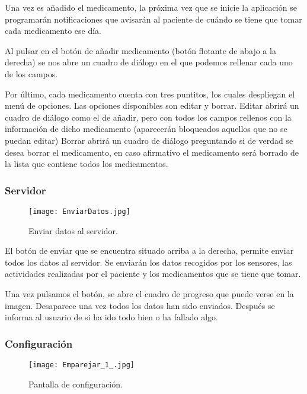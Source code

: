 \documentclass[11pt,spanish]{article}
\begin{document}
Una vez es añadido el medicamento, la próxima vez que se inicie la aplicación se programarán notificaciones que avisarán al paciente de cuándo se tiene que tomar cada medicamento ese día.
\newline

Al pulsar en el botón de añadir medicamento (botón flotante de abajo a la derecha) se nos abre un cuadro de diálogo en el que podemos rellenar cada uno de los campos.
\newline

Por último, cada medicamento cuenta con tres puntitos, los cuales despliegan el menú de opciones. Las opciones disponibles son editar y borrar. Editar abrirá un cuadro de diálogo como el de añadir, pero con todos los campos rellenos con la información de dicho medicamento (aparecerán bloqueados aquellos que no se puedan editar) Borrar abrirá un cuadro de diálogo preguntando si de verdad se desea borrar el medicamento, en caso afirmativo el medicamento será borrado de la lista que contiene todos los medicamentos.

\subsubsection{Servidor}
\begin{figure}[!htb]
\centering
\texttt{[image: EnviarDatos.jpg]}
\caption{Enviar datos al servidor.}
\end{figure}

El botón de enviar que se encuentra situado arriba a la derecha, permite enviar todos los datos al servidor. Se enviarán los datos recogidos por los sensores, las actividades realizadas por el paciente y los medicamentos que se tiene que tomar.
\newline

Una vez pulsamos el botón, se abre el cuadro de progreso que puede verse en la imagen. Desaparece una vez todos los datos han sido enviados. Después se informa al usuario de si ha ido todo bien o ha fallado algo.
\newline

\subsubsection{Configuración}
\begin{figure}[!htb]
\centering
\texttt{[image: Emparejar\_1\_.jpg]}
\caption{Pantalla de configuración.}
\end{figure}
\end{document}

